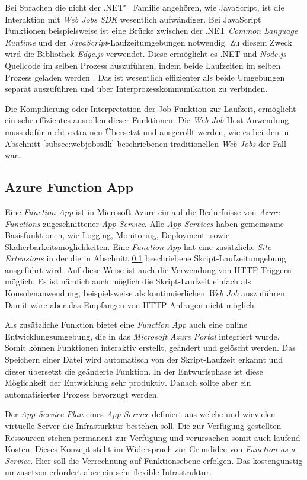 Bei Sprachen die nicht der .NET"=Familie angehören, wie \zB JavaScript, ist die Interaktion mit \textit{Web Jobs SDK} wesentlich aufwändiger. Bei JavaScript Funktionen beispielsweise ist eine Brücke zwischen der .NET \textit{Common Language Runtime} und der \textit{JavaScript}-Laufzeitumgebungen notwendig. Zu diesem Zweck wird die Bibliothek \textit{Edge.js} verwendet. Diese ermöglicht es .NET und \textit{Node.js} Quellcode im selben Prozess auszuführen, indem beide Laufzeiten im selben Prozess geladen werden \cite{EdgeJs}. Das ist wesentlich effizienter als beide Umgebungen separat auszuführen und über Interprozesskommunikation zu verbinden.

Die Kompilierung oder Interpretation der Job Funktion zur Laufzeit, ermöglicht ein sehr effizientes ausrollen dieser Funktionen. Die \textit{Web Job} Host-Anwendung muss dafür nicht extra neu Übersetzt und ausgerollt werden, wie es bei den in Abschnitt \ref{subsec:webjobssdk} beschriebenen traditionellen \textit{Web Jobs} der Fall war.

\subsection{Azure Function App}

Eine \textit{Function App} ist in Microsoft Azure ein auf die Bedürfnisse von \textit{Azure Functions} zugeschnittener \textit{App Service}. Alle \textit{App Services} haben gemeinsame Basisfunktionen, wie \zB Logging, Monitoring, Deployment- sowie Skalierbarkeitsmöglichkeiten. Eine \textit{Function App} hat eine zusätzliche \textit{Site Extensions} in der die in Abschnitt \ref{} beschriebene Skript-Laufzeitumgebung ausgeführt wird. Auf diese Weise ist auch die Verwendung von HTTP-Triggern möglich. Es ist nämlich auch möglich die Skript-Laufzeit einfach als Konsolenanwendung, beispielsweise als kontinuierlichen \textit{Web Job} auszuführen. Damit wäre aber das Empfangen von HTTP-Anfragen nicht möglich.

Als zusätzliche Funktion bietet eine \textit{Function App} auch eine online Entwicklungsumgebung, die in das \textit{Microsoft Azure Portal} integriert wurde. Somit können Funktionen interaktiv erstellt, geändert und gelöscht werden. Das Speichern einer Datei wird automatisch von der Skript-Laufzeit erkannt und dieser übersetzt die geänderte Funktion. In der Entwurfsphase ist diese Möglichkeit der Entwicklung sehr produktiv. Danach sollte aber ein automatisierter Prozess bevorzugt werden.

Der \textit{App Service Plan} eines \textit{App Service} definiert aus welche und wievielen virtuelle Server die Infrasturktur bestehen soll. Die zur Verfügung gestellten Ressourcen stehen permanent zur Verfügung und verursachen somit auch laufend Kosten. Dieses Konzept steht im Widerspruch zur Grundidee von \textit{Function-as-a-Service}. Hier soll die Verrechnung auf Funktionsebene erfolgen. Das kostengünstig umzusetzen erfordert aber ein sehr flexible Infrastruktur.

